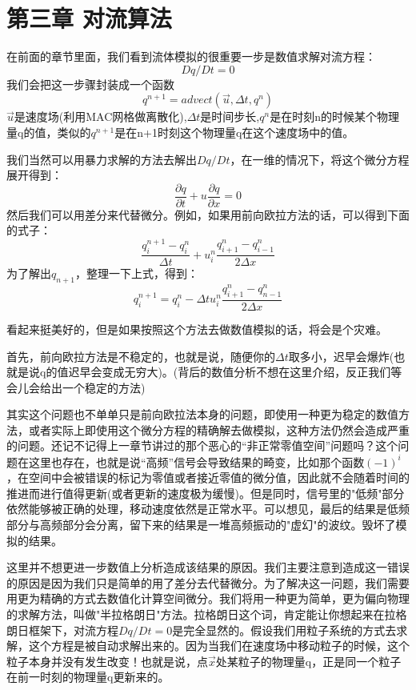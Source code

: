\documentclass{article}
\begin{document}
\section{第三章 对流算法}
在前面的章节里面，我们看到流体模拟的很重要一步是数值求解对流方程：
\begin{equation}
Dq/Dt=0
\end{equation}
我们会把这一步骤封装成一个函数
\begin{equation}
q^{n+1}=advect(\vec{u},\Delta{t},q^n)
\end{equation}
$\vec{u}$是速度场(利用MAC网格做离散化),$\Delta{t}$是时间步长,$q^n$是在时刻n的时候某个物理量q的值，类似的$q^{n+1}$是在n+1时刻这个物理量q在这个速度场中的值。
\par
我们当然可以用暴力求解的方法去解出$Dq/Dt$，在一维的情况下，将这个微分方程展开得到：
\begin{equation}
\frac{\partial{q}}{\partial{t}}+u\frac{\partial{q}}{\partial{x}}=0
\end{equation}
然后我们可以用差分来代替微分。例如，如果用前向欧拉方法的话，可以得到下面的式子：
\begin{equation}
\frac{q_i^{n+1}-q_i^n}{\Delta{t}}+u^n_i\frac{q^n_{i+1}-q^n_{i-1}}{2\Delta{x}}
\end{equation}
为了解出$q_{n+1}$，整理一下上式，得到：
\begin{equation}
q_i^{n+1}=q_i^{n}-\Delta{t}u^n_i\frac{q^n_{i+1}-q^n_{n-1}}{2\Delta{x}}
\end{equation}
\par
看起来挺美好的，但是如果按照这个方法去做数值模拟的话，将会是个灾难。
\par
首先，前向欧拉方法是不稳定的，也就是说，随便你的$\Delta{t}$取多小，迟早会爆炸(也就是说q的值迟早会变成无穷大)。(背后的数值分析不想在这里介绍，反正我们等会儿会给出一个稳定的方法)
\par
其实这个问题也不单单只是前向欧拉法本身的问题，即使用一种更为稳定的数值方法，或者实际上即使用这个微分方程的精确解去做模拟，这种方法仍然会造成严重的问题。还记不记得上一章节讲过的那个恶心的“非正常零值空间”问题吗？这个问题在这里也存在，也就是说“高频”信号会导致结果的畸变，比如那个函数$(-1)^i$，在空间中会被错误的标记为零值或者接近零值的微分值，因此就不会随着时间的推进而进行值得更新(或者更新的速度极为缓慢)。但是同时，信号里的"低频"部分依然能够被正确的处理，移动速度依然是正常水平。可以想见，最后的结果是低频部分与高频部分会分离，留下来的结果是一堆高频振动的"虚幻"的波纹。毁坏了模拟的结果。
\par
这里并不想更进一步数值上分析造成该结果的原因。我们主要注意到造成这一错误的原因是因为我们只是简单的用了差分去代替微分。为了解决这一问题，我们需要用更为精确的方式去数值化计算空间微分。我们将用一种更为简单，更为偏向物理的求解方法，叫做"半拉格朗日"方法。拉格朗日这个词，肯定能让你想起来在拉格朗日框架下，对流方程$Dq/Dt=0$是完全显然的。假设我们用粒子系统的方式去求解，这个方程是被自动求解出来的。因为当我们在速度场中移动粒子的时候，这个粒子本身并没有发生改变！也就是说，点$\vec{x}$处某粒子的物理量q，正是同一个粒子在前一时刻的物理量q更新来的。
\end{document}
